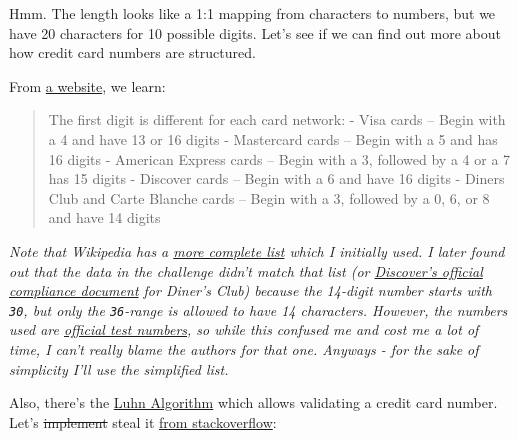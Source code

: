\documentclass[11pt]{article}
\begin{document}
    Hmm. The length looks like a 1:1 mapping from characters to numbers, but
we have 20 characters for 10 possible digits. Let's see if we can find
out more about how credit card numbers are structured.

From
\href{https://www.creditcardinsider.com/learn/anatomy-of-a-credit-card/}{a
website}, we learn:

\begin{quote}
The first digit is different for each card network: - Visa cards --
Begin with a 4 and have 13 or 16 digits - Mastercard cards -- Begin with
a 5 and has 16 digits - American Express cards -- Begin with a 3,
followed by a 4 or a 7 has 15 digits - Discover cards -- Begin with a 6
and have 16 digits - Diners Club and Carte Blanche cards -- Begin with a
3, followed by a 0, 6, or 8 and have 14 digits
\end{quote}

\emph{Note that Wikipedia has a
\href{https://en.wikipedia.org/wiki/Payment_card_number\#Issuer_identification_number_(IIN)}{more
complete list} which I initially used. I later found out that the data
in the challenge didn't match that list (or
\href{https://www.discovernetwork.com/downloads/IPP_VAR_Compliance.pdf}{Discover's
official compliance document} for Diner's Club) because the 14-digit
number starts with \texttt{30}, but only the \texttt{36}-range is
allowed to have 14 characters. However, the numbers used are
\href{https://www.paypalobjects.com/en_AU/vhelp/paypalmanager_help/credit_card_numbers.htm}{official
test numbers}, so while this confused me and cost me a lot of time, I
can't really blame the authors for that one. Anyways - for the sake of
simplicity I'll use the simplified list.}

Also, there's the
\href{https://en.wikipedia.org/wiki/Luhn_algorithm}{Luhn Algorithm}
which allows validating a credit card number. Let's \sout{implement}
steal it \href{https://stackoverflow.com/a/21079551}{from
stackoverflow}:
\end{document}
